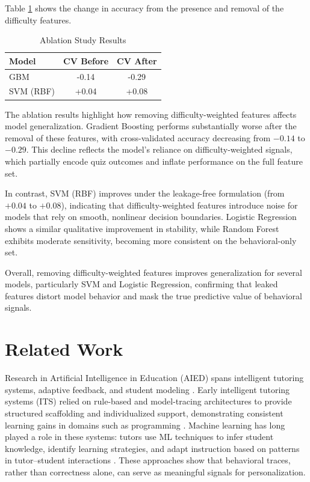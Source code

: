 \documentclass[conference]{IEEEtran}
\begin{document}
Table \ref{table:ablation} shows the change in accuracy from the presence and removal of the difficulty features. 
\begin{table}[H]
\centering
\caption{Ablation Study Results}
\begin{tabular}{lcc}
\toprule
Model & CV Before & CV After \\
\midrule
GBM & -0.14 & -0.29 \\
SVM (RBF) & +0.04 & +0.08 \\
\bottomrule
\end{tabular}
\label{table:ablation}
\end{table}

The ablation results highlight how removing difficulty-weighted
features affects model generalization. Gradient Boosting performs
substantially worse after the removal of these features, with
cross-validated accuracy decreasing from $-0.14$ to $-0.29$.
This decline reflects the model’s reliance on difficulty-weighted
signals, which partially encode quiz outcomes and inflate
performance on the full feature set.

In contrast, SVM (RBF) improves under the leakage-free
formulation (from $+0.04$ to $+0.08$), indicating that
difficulty-weighted features introduce noise for models that rely
on smooth, nonlinear decision boundaries. Logistic Regression
shows a similar qualitative improvement in stability, while
Random Forest exhibits moderate sensitivity, becoming more
consistent on the behavioral-only set.

Overall, removing difficulty-weighted features improves
generalization for several models, particularly SVM and
Logistic Regression, confirming that leaked features distort
model behavior and mask the true predictive value of behavioral
signals.

\section{Related Work}


Research in Artificial Intelligence in Education (AIED) spans intelligent
tutoring systems, adaptive feedback, and student modeling
\cite{woolf2013aied}. Early intelligent tutoring systems
(ITS) relied on rule-based and model-tracing architectures to provide
structured scaffolding and individualized support, demonstrating
consistent learning gains in domains such as programming
\cite{koedinger2015learning}. Machine learning has long played a role in
these systems: tutors use ML techniques to infer student knowledge,
identify learning strategies, and adapt instruction based on patterns in
tutor–student interactions \cite{woolf2013aied}. These approaches show that behavioral traces, rather than correctness alone, can serve as meaningful signals for personalization.
\end{document}
